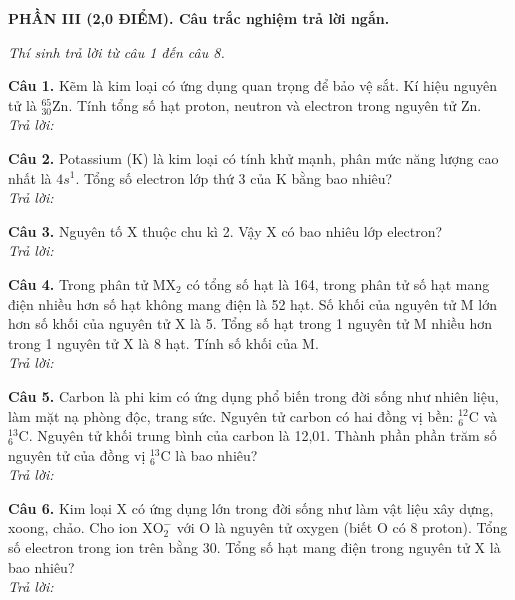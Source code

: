 \documentclass[11pt,a4paper]{article}
\begin{document}
\vspace{6pt}
{\color{myGreen}\bfseries\large PHẦN III (2,0 ĐIỂM). Câu trắc nghiệm trả lời ngắn.}

\textit{\small Thí sinh trả lời từ câu 1 đến câu 8.}
\vspace{3pt}

\textbf{Câu 1.} Kẽm là kim loại có ứng dụng quan trọng để bảo vệ sắt. Kí hiệu nguyên tử là $^{65}_{30}\text{Zn}$. Tính tổng số hạt proton, neutron và electron trong nguyên tử Zn.\\
\textit{Trả lời:} \dotfill\par\vspace{2pt}

\textbf{Câu 2.} Potassium (K) là kim loại có tính khử mạnh, phân mức năng lượng cao nhất là $4s^1$. Tổng số electron lớp thứ 3 của K bằng bao nhiêu?\\
\textit{Trả lời:} \dotfill\par\vspace{2pt}

\textbf{Câu 3.} Nguyên tố X thuộc chu kì 2. Vậy X có bao nhiêu lớp electron?\\
\textit{Trả lời:} \dotfill\par\vspace{2pt}

\textbf{Câu 4.} Trong phân tử $\text{MX}_2$ có tổng số hạt là 164, trong phân tử số hạt mang điện nhiều hơn số hạt không mang điện là 52 hạt. Số khối của nguyên tử M lớn hơn số khối của nguyên tử X là 5. Tổng số hạt trong 1 nguyên tử M nhiều hơn trong 1 nguyên tử X là 8 hạt. Tính số khối của M.\\
\textit{Trả lời:} \dotfill\par\vspace{2pt}

\textbf{Câu 5.} Carbon là phi kim có ứng dụng phổ biến trong đời sống như nhiên liệu, làm mặt nạ phòng độc, trang sức. Nguyên tử carbon có hai đồng vị bền: $^{12}_6\text{C}$ và $^{13}_6\text{C}$. Nguyên tử khối trung bình của carbon là 12,01. Thành phần phần trăm số nguyên tử của đồng vị $^{13}_6\text{C}$ là bao nhiêu?\\
\textit{Trả lời:} \dotfill\par\vspace{2pt}

\textbf{Câu 6.} Kim loại X có ứng dụng lớn trong đời sống như làm vật liệu xây dựng, xoong, chảo. Cho ion $\text{XO}_2^-$ với O là nguyên tử oxygen (biết O có 8 proton). Tổng số electron trong ion trên bằng 30. Tổng số hạt mang điện trong nguyên tử X là bao nhiêu?\\
\textit{Trả lời:} \dotfill\par\vspace{2pt}
\end{document}
